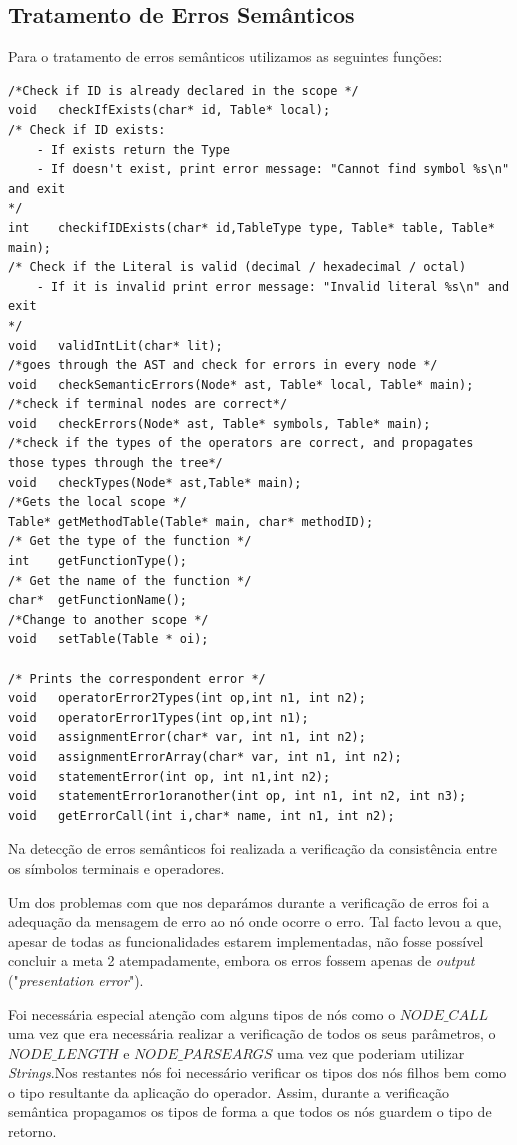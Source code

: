 \documentclass[12pt]{article}
\begin{document}
\pagebreak
\subsection{Tratamento de Erros Semânticos}
Para o tratamento de erros semânticos utilizamos as seguintes funções:
\begin{lstlisting}
/*Check if ID is already declared in the scope */
void   checkIfExists(char* id, Table* local);
/* Check if ID exists:
	- If exists return the Type 
	- If doesn't exist, print error message: "Cannot find symbol %s\n" and exit 
*/
int    checkifIDExists(char* id,TableType type, Table* table, Table* main);
/* Check if the Literal is valid (decimal / hexadecimal / octal)
	- If it is invalid print error message: "Invalid literal %s\n" and exit
*/
void   validIntLit(char* lit);
/*goes through the AST and check for errors in every node */
void   checkSemanticErrors(Node* ast, Table* local, Table* main);
/*check if terminal nodes are correct*/
void   checkErrors(Node* ast, Table* symbols, Table* main);
/*check if the types of the operators are correct, and propagates those types through the tree*/
void   checkTypes(Node* ast,Table* main);
/*Gets the local scope */
Table* getMethodTable(Table* main, char* methodID);
/* Get the type of the function */
int    getFunctionType();
/* Get the name of the function */
char*  getFunctionName();
/*Change to another scope */
void   setTable(Table * oi);

/* Prints the correspondent error */
void   operatorError2Types(int op,int n1, int n2);
void   operatorError1Types(int op,int n1);
void   assignmentError(char* var, int n1, int n2);
void   assignmentErrorArray(char* var, int n1, int n2);
void   statementError(int op, int n1,int n2);
void   statementError1oranother(int op, int n1, int n2, int n3);
void   getErrorCall(int i,char* name, int n1, int n2);

\end{lstlisting}

Na detecção de erros semânticos foi realizada a verificação da consistência entre os símbolos terminais e operadores.
\par Um dos problemas com que nos deparámos durante a verificação de erros foi a adequação da mensagem de erro ao nó onde ocorre o erro. Tal facto levou a que, apesar de todas as funcionalidades estarem implementadas, não fosse possível concluir a meta 2 atempadamente, embora os erros fossem apenas de \emph{output} ("\emph{presentation error}"). 
\par Foi necessária especial atenção com alguns tipos de nós como o $NODE\_CALL$ uma vez que era necessária realizar a verificação de todos os seus parâmetros, o $NODE\_LENGTH$ e $NODE\_PARSEARGS$ uma vez que poderiam utilizar \emph{Strings}.Nos restantes nós foi necessário verificar os tipos dos nós filhos bem como o tipo resultante da aplicação do operador. Assim, durante a verificação semântica propagamos os tipos de forma a que todos os nós guardem o tipo de retorno.
\end{document}
